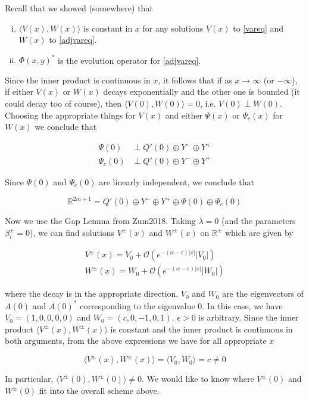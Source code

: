 \documentclass[12pt]{article}
\def\R{{\mathbb R}}
\begin{document}
Recall that we showed (somewhere) that

\begin{enumerate}[(i)]
\item $\langle V(x), W(x) \rangle$ is constant in $x$ for any solutions $V(x)$ to \eqref{vareq} and $W(x)$ to \eqref{adjvareq}.
\item $\Phi(x, y)^*$ is the evolution operator for \eqref{adjvareq}.
\end{enumerate}

Since the inner product is continuous in $x$, it follows that if as $x \rightarrow \infty$ (or $-\infty$), if either $V(x)$ or $W(x)$ decays exponentially and the other one is bounded (it could decay too of course), then $\langle V(0), W(0) \rangle = 0$, i.e. $V(0) \perp W(0)$. Choosing the appropriate things for $V(x)$ and either $\Psi(x)$ or $\Psi_c(x)$ for $W(x)$ we conclude that

\begin{align*}
\Psi(0) &\perp Q'(0) \oplus Y^- \oplus Y^+ \\
\Psi_c(0) &\perp Q'(0) \oplus Y^- \oplus Y^+
\end{align*}

Since $\Psi(0)$ and $\Psi_c(0)$ are linearly independent, we conclude that 

\[
\R^{2m + 1} = Q'(0) \oplus Y^- \oplus Y^+ \oplus \Psi(0) \oplus \Psi_c(0) 
\]

Now we use the Gap Lemma from Zum2018. Taking $\lambda = 0$ (and the parameters $\beta_i^\pm = 0$), we can find solutions $V^\pm(x)$ and $W^\pm(x)$ on $\R^\pm$ which are given by

\begin{align*}
V^\pm(x) = V_0 + \mathcal{O}(e^{-(\alpha - \epsilon)|x|}|V_0|) \\
W^\pm(x) = W_0 + \mathcal{O}(e^{-(\alpha - \epsilon)|x|}|W_0|)
\end{align*}

where the decay is in the appropriate direction. $V_0$ and $W_0$ are the eigenvectors of $A(0)$ and $A(0)^*$ corresponding to the eigenvalue 0. In this case, we have $V_0 = (1, 0, 0, 0, 0)$ and $W_0 = (c, 0, -1, 0, 1)$. $\epsilon > 0$ is arbitrary. Since the inner product $\langle V^\pm(x), W^\pm(x) \rangle$ is constant and the inner product is continuous in both arguments, from the above expressions we have for all appropriate $x$

\[
\langle V^\pm(x), W^\pm(x) \rangle = \langle V_0, W_0 \rangle = c \neq 0
\]

In particular, $\langle V^\pm(0), W^\pm(0) \rangle \neq 0$. We would like to know where $V^\pm(0)$ and $W^\pm(0)$ fit into the overall scheme above. \\
\end{document}
